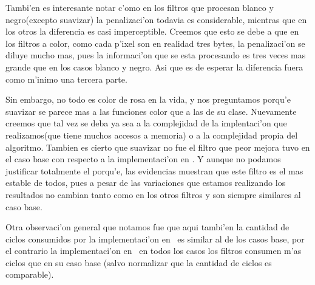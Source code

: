 Tambi'en es interesante notar c'omo en los filtros que procesan blanco y negro(excepto suavizar) la penalizaci'on todavia es considerable, mientras que en los otros la diferencia es casi imperceptible. Creemos que esto se debe a que en los filtros a color, como cada p'ixel son en realidad tres bytes, la penalizaci'on se diluye mucho mas, pues la informaci'on que se esta procesando es tres veces mas grande que en los casos blanco y negro. Asi que es de esperar la diferencia fuera como m'inimo una tercera parte. 

Sin embargo, no todo es color de rosa en la vida, y nos preguntamos porqu'e suavizar se parece mas a las funciones color que a las de su clase. Nuevamente creemos que tal vez se deba ya sea a la complejidad de la implentaci'on que realizamos(que tiene muchos accesos a memoria) o a la complejidad propia del algoritmo. Tambien es cierto que suavizar no fue el filtro que peor mejora tuvo en el caso base con respecto a la implementaci'on en \C. Y aunque no podamos justificar totalmente el porqu'e, las evidencias muestran que este filtro es el mas estable de todos, pues a pesar de las variaciones que estamos realizando los resultados no cambian tanto como en los otros filtros y son siempre similares al caso base.

Otra observaci'on general que notamos fue que aqui tambi'en la cantidad de ciclos consumidos por la implementaci'on en \C \ es
similar al de los casos base, por el contrario la implementaci'on en \ass \ en todos los casos los filtros consumen m'as ciclos que en su caso base (salvo normalizar que la cantidad de ciclos es comparable).

